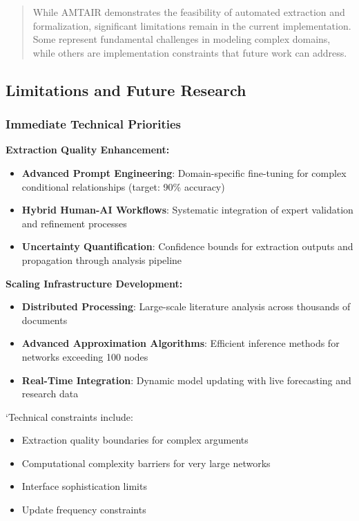\documentclass[
  11pt,
  letterpaper,
]{book}
\providecommand{\tightlist}{%
  \setlength{\itemsep}{0pt}\setlength{\parskip}{0pt}}
\begin{document}
\begin{quote}
While AMTAIR demonstrates the feasibility of automated extraction and
formalization, significant limitations remain in the current
implementation. Some represent fundamental challenges in modeling
complex domains, while others are implementation constraints that future
work can address.
\end{quote}

\subsection{Limitations and Future Research}\label{sec-future-research2}

\subsubsection{Immediate Technical
Priorities}\label{sec-technical-priorities}

\textbf{Extraction Quality Enhancement:}

\begin{itemize}
\tightlist
\item
  \textbf{Advanced Prompt Engineering}: Domain-specific fine-tuning for
  complex conditional relationships (target: 90\% accuracy)
\item
  \textbf{Hybrid Human-AI Workflows}: Systematic integration of expert
  validation and refinement processes
\item
  \textbf{Uncertainty Quantification}: Confidence bounds for extraction
  outputs and propagation through analysis pipeline
\end{itemize}

\textbf{Scaling Infrastructure Development:}

\begin{itemize}
\tightlist
\item
  \textbf{Distributed Processing}: Large-scale literature analysis
  across thousands of documents
\item
  \textbf{Advanced Approximation Algorithms}: Efficient inference
  methods for networks exceeding 100 nodes
\item
  \textbf{Real-Time Integration}: Dynamic model updating with live
  forecasting and research data
\end{itemize}

`Technical constraints include:

\begin{itemize}
\tightlist
\item
  Extraction quality boundaries for complex arguments
\item
  Computational complexity barriers for very large networks
\item
  Interface sophistication limits
\item
  Update frequency constraints
\end{itemize}
\end{document}
